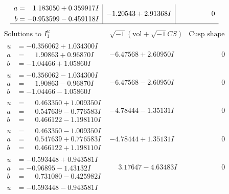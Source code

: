\documentclass[1p]{elsarticle_modified}
\theoremstyle{definition}
\newcommand{\I}{\sqrt{-1}}
\begin{document}
$$\begin{array}{c|c|c}
\begin{aligned}
a &= \phantom{-}1.183050 + 0.359917 I \\
b &= -0.953599 - 0.459118 I\end{aligned}
 & -1.20543 + 2.91368 I & \phantom{-0.000000 } 0\\
 \hline 
 \end{array}$$\newpage$$\begin{array}{c|c|c}  
\text{Solutions to }I^u_{1}& \I (\text{vol} + \sqrt{-1}CS) & \text{Cusp shape}\\
 \hline 
\begin{aligned}
u &= -0.356062 + 1.034300 I \\
a &= \phantom{-}1.90863 + 0.96870 I \\
b &= -1.04466 + 1.05860 I\end{aligned}
 & -6.47568 + 2.60950 I & \phantom{-0.000000 } 0 \\ \hline\begin{aligned}
u &= -0.356062 - 1.034300 I \\
a &= \phantom{-}1.90863 - 0.96870 I \\
b &= -1.04466 - 1.05860 I\end{aligned}
 & -6.47568 - 2.60950 I & \phantom{-0.000000 } 0 \\ \hline\begin{aligned}
u &= \phantom{-}0.463350 + 1.009350 I \\
a &= \phantom{-}0.547639 - 0.776583 I \\
b &= \phantom{-}0.466122 - 1.198110 I\end{aligned}
 & -4.78444 - 1.35131 I & \phantom{-0.000000 } 0 \\ \hline\begin{aligned}
u &= \phantom{-}0.463350 - 1.009350 I \\
a &= \phantom{-}0.547639 + 0.776583 I \\
b &= \phantom{-}0.466122 + 1.198110 I\end{aligned}
 & -4.78444 + 1.35131 I & \phantom{-0.000000 } 0 \\ \hline\begin{aligned}
u &= -0.593448 + 0.943581 I \\
a &= -0.96895 - 1.43132 I \\
b &= \phantom{-}0.731080 - 0.425982 I\end{aligned}
 & \phantom{-}3.17647 - 4.63483 I & \phantom{-0.000000 } 0 \\ \hline\begin{aligned}
u &= -0.593448 - 0.943581 I \\

\end{aligned}
\end{array}$$
\end{document}
